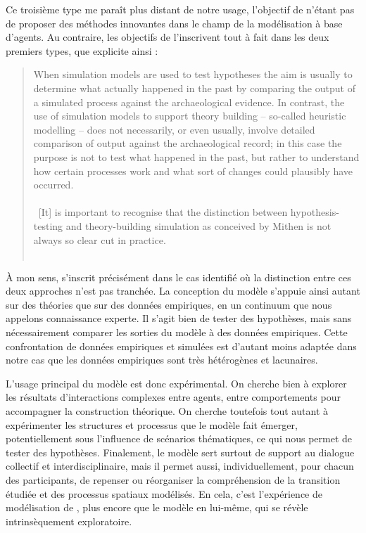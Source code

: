 Ce troisième type me paraît plus distant de notre usage, l'objectif de \simfeodal{} n'étant pas de proposer des méthodes innovantes dans le champ de la modélisation à base d'agents.
Au contraire, les objectifs de \simfeodal{} l'inscrivent tout à fait dans les deux premiers types, que \citeauthor{lake_trends_2014} explicite ainsi :
\begin{quotation}
\noindent \og 
When simulation models are used to test hypotheses the aim is usually to determine what actually happened in the past by comparing the output of a simulated process against the archaeological evidence.
In contrast, the use of simulation models to support theory building -- so-called heuristic modelling -- does not necessarily, or even usually, involve detailed comparison of output against the archaeological record;
in this case the purpose is not to test what happened in the past, but rather to understand how certain processes work and what sort of changes could plausibly have occurred.\\
\textelp{} \\
~[It] is important to recognise that the distinction between hypothesis-testing and theory-building simulation as conceived by Mithen is not always so clear cut in practice.
\fg{} \\
\citetrackerfalse
\mbox{}~ \hfill \cite[260]{lake_trends_2014}
\citetrackertrue
\end{quotation}

À mon sens, \simfeodal{} s'inscrit précisément dans le cas identifié où la distinction entre ces deux approches n'est pas tranchée.
La conception du modèle s'appuie ainsi autant sur des théories que sur des données empiriques, en un continuum que nous appelons \og connaissance experte\fg{}.
Il s'agit bien de tester des hypothèses, mais sans nécessairement comparer les sorties du modèle à des données empiriques.
Cette confrontation de données empiriques et simulées est d'autant moins adaptée dans notre cas que les données empiriques sont très hétérogènes et lacunaires.

L'usage principal du modèle est donc expérimental.
On cherche bien à explorer les résultats d'interactions complexes entre agents, entre comportements pour accompagner la construction théorique.
On cherche toutefois tout autant à expérimenter les structures et processus que le modèle fait émerger, potentiellement sous l'influence de \og scénarios thématiques\fg{}, ce qui nous permet de tester des hypothèses.
Finalement, le modèle sert surtout de support au dialogue collectif et interdisciplinaire, mais il permet aussi, individuellement, pour chacun des participants, de repenser ou réorganiser la compréhension de la transition étudiée et des processus spatiaux modélisés.
En cela, c'est l'expérience de modélisation de \simfeodal{}, plus encore que le modèle en lui-même, qui se révèle intrinsèquement exploratoire.

